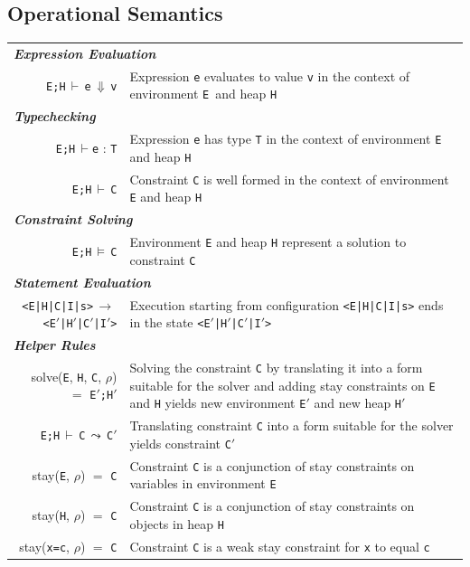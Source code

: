 \documentclass[10pt,reprint]{sigplanconf-preprint}
\newcommand{\gstay}[3]{stay({\tt #1}, {\tt #2}) $=$ {\tt #3}}
\newcommand{\phase}[5]{solve({\tt #1}, {\tt #2}, {\tt #3}, {\tt #4}) $=$ {\tt #5}}
\newcommand{\evalH}[4]{{\tt #1;#2}\,$\vdash$\,{\tt #3}\,$\Downarrow$\,{\tt #4}}
\newcommand{\solveH}[3]{{\tt #1;#2}\,$\models$\,{\tt #3}}
\newcommand{\stepH}[9]{{\tt <#1|#2|#3|#4|#5>}\,$\longrightarrow$\,{\tt <#6|#7|#8|#9>}}
\newcommand{\tcH}[4]{{\tt #1;#2}\,$\vdash${\tt #3} {\upshape :} {\tt #4}}
\newcommand{\tcHC}[3]{{\tt #1;#2}\,$\vdash$\,{\tt #3}}
\newcommand{\combine}[4]{{\tt #1;#2}\,$\vdash$\,{\tt #3}\,$\leadsto$\,{\tt #4}}
\newcommand{\E}{\texttt{\upshape E}\xspace}
\newcommand{\C}{\texttt{C}}
\newcommand{\I}{\texttt{I}}
\renewcommand{\H}{\texttt{\upshape H}\xspace}
\begin{document}
\subsection{Operational Semantics}

\begin{table}
  \centering
  \begin{tabularx}{\textwidth}{r X}
    \multicolumn{2}{l}{\textbf{\textit{Expression Evaluation}}}\\
    \evalH{\E}{\H}{e}{v} &  Expression {\tt e} evaluates to value {\tt v} in the context of
                           environment \E~and heap \H\\
    \multicolumn{2}{l}{\textbf{\textit{Typechecking}}}\\
    \tcH{\E}{\H}{e}{T} & Expression {\tt e} has type {\tt T} in the context of environment
                         {\tt \E} and heap \H\\
    \tcHC{\E}{\H}{C} & Constraint {\tt C} is well formed in the context of environment
                       {\tt \E} and heap \H \\
    \multicolumn{2}{l}{\textbf{\textit{Constraint Solving}}}\\
    \solveH{\E}{\H}{C} & Environment \E and heap \H represent a solution to constraint {\tt C} \\
    \multicolumn{2}{l}{\textbf{\textit{Statement Evaluation}}}\\
    \stepH{\E}{\H}{\C}{\I}{s}{\E$'$}{\H$'$}{\C$'$}{\I$'$} & Execution starting from configuration {\tt <\E|\H|\C|\I|s>} ends in
                                                            the state {\tt <E$'$|\H$'$|C$'$|\I$'$>}\\
    \multicolumn{2}{l}{\textbf{\textit{Helper Rules}}}\\
    \phase{\E}{\H}{\C}{$\rho$}{\E$'$;\H$'$} & Solving the constraint {\tt C} by translating it into a form suitable for the solver and adding stay constraints on \E and \H yields new environment \E$'$ and new heap \H$'$\\
    \combine{\E}{\H}{C}{C$'$} & Translating constraint {\tt C} into a form suitable for the solver yields constraint {\tt C}$'$\\
    \gstay{\E}{$\rho$}{C} & Constraint {\tt C} is a conjunction of stay constraints on variables in environment \E \\
    \gstay{\H}{$\rho$}{C} & Constraint {\tt C} is a conjunction of stay constraints on objects in heap \H \\
    \gstay{x=c}{$\rho$}{C} & Constraint {\tt C} is a weak stay constraint for {\tt x} to equal {\tt c}\\

\end{tabularx}
\end{table}
\end{document}

